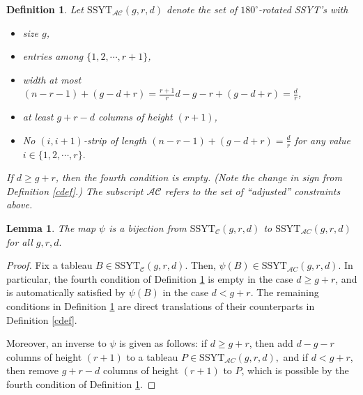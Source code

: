 \documentclass[10pt,a4paper]{amsart}
\newtheorem{definition}{Definition}
\newtheorem{lemma}{Lemma}
\begin{document}
\begin{definition}\label{ACdef}
    Let $\text{SSYT}_{\mathcal{AC}}(g,r,d)$ denote the set of $180^\circ$-rotated SSYT's with 
    \begin{itemize}
    \item  size $g$, 
    \item  entries among $\{1,2,\cdots, r+1\}$,
    \item  width at most $(n-r-1)+(g-d+r)=\frac{r+1}{r}d-g-r+(g-d+r)=\frac{d}{r}$,
    \item  at least $g+r-d$ columns of height $(r+1)$,
    \item  No $(i,i+1)$-strip of length $(n-r-1)+(g-d+r)=\frac{d}{r}$ for any value $i\in \{1,2,\cdots, r\}.$
    \end{itemize}
If $d\ge g+r$, then the fourth condition is empty. (Note the change in sign from Definition \ref{cdef}.) The subscript $\mathcal{AC}$ refers to the set of ``adjusted'' constraints above.
\end{definition}

\begin{lemma}\label{psibij}
The map $\psi$ is a bijection from $\text{SSYT}_\mathcal C(g,r,d)$ to $\text{SSYT}_{\mathcal AC}(g,r,d)$ for all $g,r,d.$ 
\end{lemma}

\begin{proof}
    Fix a tableau $B\in \text{SSYT}_\mathcal C(g,r,d).$ Then, $\psi(B)\in \text{SSYT}_{\mathcal AC}(g,r,d)$. In particular, the fourth condition of Definition \ref{ACdef} is empty in the case $d\ge g+r$, and is automatically satisfied by $\psi(B)$ in the case $d<g+r$. The remaining conditions in Definition \ref{ACdef} are direct translations of their counterparts in Definition \ref{cdef}.

    Moreover, an inverse to $\psi$ is given as follows: if $d\ge g+r$, then add $d-g-r$ columns of height $(r+1)$ to a tableau $P\in \text{SSYT}_{\mathcal AC}(g,r,d),$ and if $d<g+r$, then remove $g+r-d$ columns of height $(r+1)$ to $P$, which is possible by the fourth condition of Definition \ref{ACdef}.
\end{proof}
\end{document}
